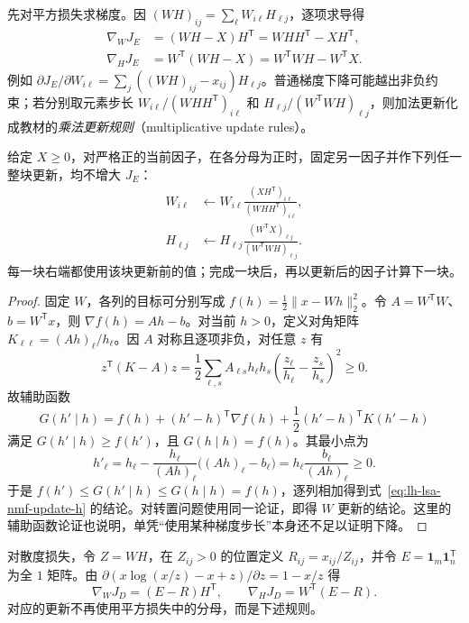 先对平方损失求梯度。因 $(WH)_{ij}=\sum_\ell W_{i\ell}H_{\ell j}$，逐项求导得
\begin{align}
\nabla_WJ_E&=(WH-X)H^{\mathsf T}=WHH^{\mathsf T}-XH^{\mathsf T},
\label{eq:lh-lsa-nmf-gradient-w}\\
\nabla_HJ_E&=W^{\mathsf T}(WH-X)=W^{\mathsf T}WH-W^{\mathsf T}X.
\label{eq:lh-lsa-nmf-gradient-h}
\end{align}
例如 $\partial J_E/\partial W_{i\ell}=\sum_j((WH)_{ij}-x_{ij})H_{\ell j}$。普通梯度下降可能越出非负约束；若分别取元素步长 $W_{i\ell}/(WHH^{\mathsf T})_{i\ell}$ 和 $H_{\ell j}/(W^{\mathsf T}WH)_{\ell j}$，则加法更新化成教材的\emph{乘法更新规则}（multiplicative update rules）。

\begin{theorem}[平方损失的乘法更新]
\label{thm:lh-lsa-nmf-euclidean-update}
给定 $X\geq0$，对严格正的当前因子，在各分母为正时，固定另一因子并作下列任一整块更新，均不增大 $J_E$：
\begin{align}
W_{i\ell}&\leftarrow W_{i\ell}
\frac{(XH^{\mathsf T})_{i\ell}}{(WHH^{\mathsf T})_{i\ell}},
\label{eq:lh-lsa-nmf-update-w}\\
H_{\ell j}&\leftarrow H_{\ell j}
\frac{(W^{\mathsf T}X)_{\ell j}}{(W^{\mathsf T}WH)_{\ell j}}.
\label{eq:lh-lsa-nmf-update-h}
\end{align}
每一块右端都使用该块更新前的值；完成一块后，再以更新后的因子计算下一块。
\end{theorem}
\begin{proof}
固定 $W$，各列的目标可分别写成 $f(h)=\frac12\|x-Wh\|_2^2$。令 $A=W^{\mathsf T}W$、$b=W^{\mathsf T}x$，则 $\nabla f(h)=Ah-b$。对当前 $h>0$，定义对角矩阵 $K_{\ell\ell}=(Ah)_\ell/h_\ell$。因 $A$ 对称且逐项非负，对任意 $z$ 有
\[
z^{\mathsf T}(K-A)z
=\frac12\sum_{\ell,s}A_{\ell s}h_\ell h_s
\left(\frac{z_\ell}{h_\ell}-\frac{z_s}{h_s}\right)^2\geq0.
\]
故辅助函数
\[
G(h'\mid h)=f(h)+(h'-h)^{\mathsf T}\nabla f(h)
+\frac12(h'-h)^{\mathsf T}K(h'-h)
\]
满足 $G(h'\mid h)\geq f(h')$，且 $G(h\mid h)=f(h)$。其最小点为
\[
h'_\ell=h_\ell-\frac{h_\ell}{(Ah)_\ell}\bigl((Ah)_\ell-b_\ell\bigr)
=h_\ell\frac{b_\ell}{(Ah)_\ell}\geq0.
\]
于是 $f(h')\leq G(h'\mid h)\leq G(h\mid h)=f(h)$，逐列相加得到式~\eqref{eq:lh-lsa-nmf-update-h} 的结论。对转置问题使用同一论证，即得 $W$ 更新的结论。这里的辅助函数论证也说明，单凭“使用某种梯度步长”本身还不足以证明下降。
\end{proof}

对散度损失，令 $Z=WH$，在 $Z_{ij}>0$ 的位置定义 $R_{ij}=x_{ij}/Z_{ij}$，并令 $E=\mathbf1_m\mathbf1_n^{\mathsf T}$ 为全 $1$ 矩阵。由 $\partial(x\log(x/z)-x+z)/\partial z=1-x/z$ 得
\begin{equation}
\nabla_WJ_D=(E-R)H^{\mathsf T},\qquad
\nabla_HJ_D=W^{\mathsf T}(E-R).
\label{eq:lh-lsa-nmf-kl-gradient}
\end{equation}
对应的更新不再使用平方损失中的分母，而是下述规则。

